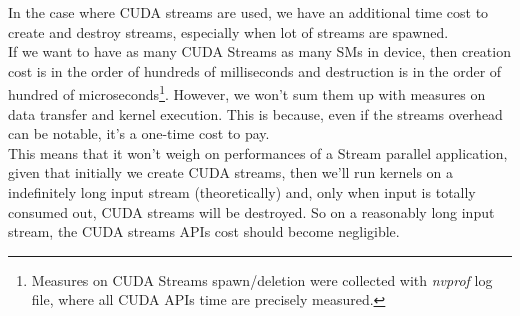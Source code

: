 In the case where CUDA streams are used, we have an additional time cost to create and destroy streams, especially when lot of streams are spawned.\\
If we want to have as many CUDA Streams as many SMs in device, then creation cost is in the order of hundreds of milliseconds and destruction is in the order of hundred of microseconds\footnote{Measures on CUDA Streams spawn/deletion were collected with \textit{nvprof} log file, where all CUDA APIs time are precisely measured.}. However, we won't sum them up with measures on data transfer and kernel execution. This is because, even if the streams overhead can be notable, it's a one-time cost to pay.\\
This means that it won't weigh on performances of a Stream parallel application, given that initially we create CUDA streams, then we'll run kernels on a indefinitely long input stream (theoretically) and, only when input is totally consumed out, CUDA streams will be destroyed. 
So on a reasonably long input stream, the CUDA streams APIs cost should become negligible.\\


